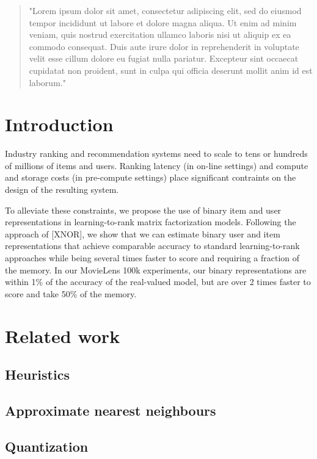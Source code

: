 \documentclass[sigconf]{acmart}
\begin{document}
\begin{abstract}
  "Lorem ipsum dolor sit amet, consectetur adipiscing elit, sed do eiusmod tempor incididunt ut labore et dolore magna aliqua. Ut enim ad minim veniam, quis nostrud exercitation ullamco laboris nisi ut aliquip ex ea commodo consequat. Duis aute irure dolor in reprehenderit in voluptate velit esse cillum dolore eu fugiat nulla pariatur. Excepteur sint occaecat cupidatat non proident, sunt in culpa qui officia deserunt mollit anim id est laborum."
\end{abstract}

\maketitle

\section{Introduction}

Industry ranking and recommendation systems need to scale to tens or hundreds of millions of items and users. Ranking latency (in on-line settings) and compute and storage costs (in pre-compute settings) place significant contraints on the design of the resulting system.

To alleviate these constraints, we propose the use of binary item and user representations in learning-to-rank matrix factorization models. Following the approach of [XNOR], we show that we can estimate binary user and item representations that achieve comparable accuracy to standard learning-to-rank approaches while being several times faster to score and requiring a fraction of the memory. In our MovieLens 100k experiments, our binary representations are within 1\% of the accuracy of the real-valued model, but are over 2 times faster to score and take 50\% of the memory.

\section{Related work}
\subsection{Heuristics}
\subsection{Approximate nearest neighbours}
\subsection{Quantization}
\end{document}

